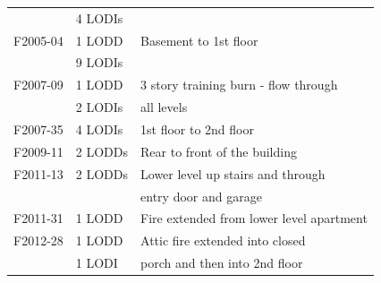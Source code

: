 \documentclass[12pt,oneside]{book}
\begin{document}
\begin{table}
\begin{tabular}{lll}
                                    &  4 LODIs            &                                                       \\
F2005-04 \cite{NIOSH:McFall4}       &  1 LODD             &  Basement to 1st floor                                \\
                                    &  9 LODIs            &                                                       \\
F2007-09 \cite{NIOSH:Tarley}        &  1 LODD             &  3 story training burn - flow through                 \\
                                    &  2 LODIs            &  all levels                                           \\
F2007-35 \cite{NIOSH:Braddee}       &  4 LODIs            &  1st floor to 2nd floor                               \\
F2009-11 \cite{NIOSH:Merinar}       &  2 LODDs            &  Rear to front of the building                        \\
F2011-13 \cite{NIOSH:Bowyer2}       &  2 LODDs            &  Lower level up stairs and through                    \\
                                    &                     &  entry door and garage                                \\
F2011-31 \cite{NIOSH:Loflin}        &  1 LODD             &  Fire extended from lower level apartment             \\
F2012-28 \cite{NIOSH:Bowyer}        &  1 LODD             &  Attic fire extended into closed                      \\
                                    &  1 LODI             &  porch and then into 2nd floor                        \\
\bottomrule[1.25pt]
\end{tabular}\par
\end{table}
\end{document}
